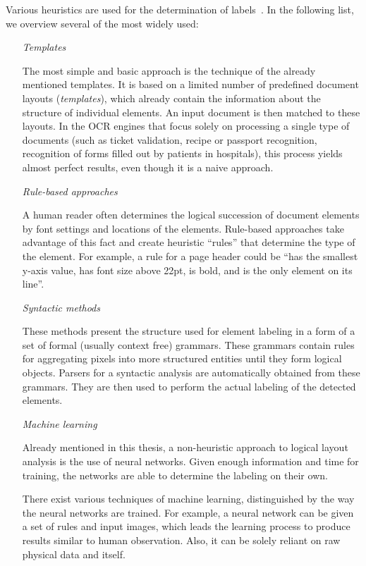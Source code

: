 Various heuristics are used for the determination of labels~\cite{logicalLayoutTemplate}. In the following list, we overview several of the most widely used:

\begin{itemize}
\item[\emph{Templates}]

The most simple and basic approach is the technique of the already mentioned templates. It is based on a limited number of predefined document layouts (\emph{templates}), which already contain the information about the structure of individual elements. An input document is then matched to these layouts. In the OCR engines that focus solely on processing a single type of documents (such as ticket validation, recipe or passport recognition, recognition of forms filled out by patients in hospitals), this process yields almost perfect results, even though it is a naive approach.

\item[\emph{Rule-based approaches}]

A human reader often determines the logical succession of document elements by font settings and locations of the elements. Rule-based approaches take advantage of this fact and create heuristic ``rules'' that determine the type of the element. For example, a rule for a page header could be ``has the smallest y-axis value, has font size above 22pt, is bold, and is the only element on its line''.

\item[\emph{Syntactic methods}]

These methods present the structure used for element labeling in a form of a set of formal (usually context free) grammars. These grammars contain rules for aggregating pixels into more structured entities until they form logical objects. Parsers for a syntactic analysis are automatically obtained from these grammars. They are then used to perform the actual labeling of the detected elements.

\item[\emph{Machine learning}]

Already mentioned in this thesis, a non-heuristic approach to logical layout analysis is the use of neural networks. Given enough information and time for training, the networks are able to determine the labeling on their own.

There exist various techniques of machine learning, distinguished by the way the neural networks are trained. For example, a neural network can be given a set of rules and input images, which leads the learning process to produce results similar to human observation. Also, it can be solely reliant on raw physical data and itself.

\end{itemize}

